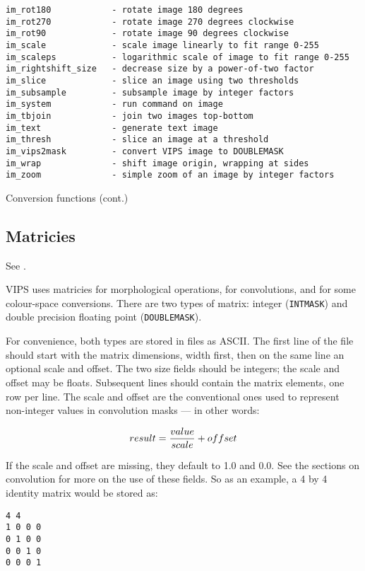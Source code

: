 \begin{fig2}
\begin{verbatim}
im_rot180            - rotate image 180 degrees
im_rot270            - rotate image 270 degrees clockwise
im_rot90             - rotate image 90 degrees clockwise
im_scale             - scale image linearly to fit range 0-255
im_scaleps           - logarithmic scale of image to fit range 0-255
im_rightshift_size   - decrease size by a power-of-two factor
im_slice             - slice an image using two thresholds
im_subsample         - subsample image by integer factors
im_system            - run command on image
im_tbjoin            - join two images top-bottom
im_text              - generate text image
im_thresh            - slice an image at a threshold
im_vips2mask         - convert VIPS image to DOUBLEMASK
im_wrap              - shift image origin, wrapping at sides
im_zoom              - simple zoom of an image by integer factors
\end{verbatim}
\caption{Conversion functions (cont.)}
\end{fig2}

\subsection{Matricies}

See .

VIPS uses matricies for morphological operations, for convolutions, and
for some colour-space conversions. There are two types of matrix: integer
(\verb+INTMASK+) and double precision floating point (\verb+DOUBLEMASK+).

For convenience, both types are stored in files as ASCII. The first
line of the file should start with the matrix dimensions, width first,
then on the same line an optional scale and offset. The two size fields
should be integers; the scale and offset may be floats. Subsequent lines
should contain the matrix elements, one row per line.  The scale and
offset are the conventional ones used to represent non-integer values in
convolution masks --- in other words:

\[
result = {value \over scale} + offset
\]

If the scale and offset are missing, they default to 1.0 and 0.0.  See the
sections on convolution for more on the use of these fields. So as an example,
a 4 by 4 identity matrix would be stored as:

\begin{verbatim}
4 4 
1 0 0 0
0 1 0 0 
0 0 1 0
0 0 0 1
\end{verbatim}
  
